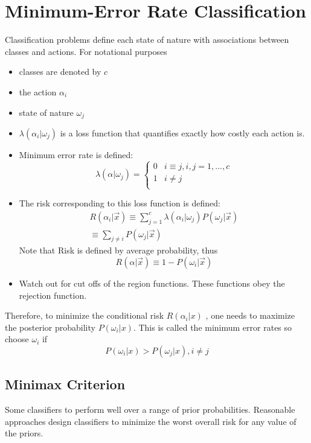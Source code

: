 \documentclass[11pt]{article}
\begin{document}
\section{Minimum-Error Rate Classification}
Classification problems define each state of nature with associations between classes and actions.  For notational purposes 
\begin{itemize}
	\item classes are denoted by $c$
	\item the action $\alpha_i$
	\item state of nature $\omega_j$
	\item $\lambda(\alpha_i | \omega_j)$ is a loss function that quantifies exactly how costly each action is. 
	\item Minimum error rate is defined:
	\begin{equation}
		\lambda (\alpha | \omega_j) =
	\left\{
	\begin{array}{ll}
	0  &    i \equiv j , i,j = 1 , ..., c \\
	1  &    i \neq j  \\
	\end{array}
	\right.
	\end{equation}
	\item The risk corresponding to this loss function is defined:
	\begin{eqnarray}
		R(\alpha_i | \vec{x}) \equiv \sum ^c _{j=1}  \lambda (\alpha_i | \omega_j) P(\omega_j | \vec{x})  \\
		\equiv \sum _{j\neq i} P (\omega_j | \vec{x})
	\end{eqnarray}
	Note that Risk is defined by average probability, thus 
	\[ 
		R(\alpha | \vec{x}) \equiv 1 - P(\omega_i | \vec{x}) 
	\]
	\item Watch out for cut offs of the region functions.  These functions obey the rejection function.
\end{itemize}





Therefore, to minimize the conditional risk $R(\alpha_i | x)$ , one needs to maximize the posterior probability $P(\omega_i | x)$.   This is called the minimum error rates 
so choose $\omega_i$ if 
\[ 
P(\omega_i | x ) > P(\omega_j | x), i \neq j
\]

\subsection{Minimax Criterion}
Some classifiers to perform well over a range of prior probabilities.  Reasonable approaches design classifiers to minimize the worst overall risk for any value of the priors.
\end{document}
